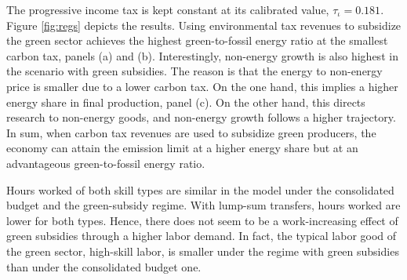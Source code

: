 The progressive income tax is kept constant at its calibrated value, $\tau_{\iota}=0.181$. Figure \ref{fig:regs} depicts the results.
Using environmental tax revenues to subsidize the green sector achieves the highest green-to-fossil energy ratio at the smallest carbon tax, panels (a) and (b). Interestingly, non-energy growth is also highest in the scenario with green subsidies. The reason is that the energy to non-energy price is smaller due to a lower carbon tax. On the one hand, this implies a higher energy share in final production, panel (c). On the other hand, this directs research to non-energy goods, and non-energy growth follows a higher trajectory. In sum, when carbon tax revenues are used to subsidize green producers, the economy can attain the emission limit at a higher energy share but at an advantageous green-to-fossil energy ratio. 

Hours worked of both skill types are similar in the model under the consolidated budget and the green-subsidy regime. With lump-sum transfers, hours worked are lower for both types. Hence, there does not seem to be a work-increasing effect of green subsidies through a higher labor demand. In fact, the typical labor good of the green sector, high-skill labor, is smaller under the regime with green subsidies than under the consolidated budget one. 

